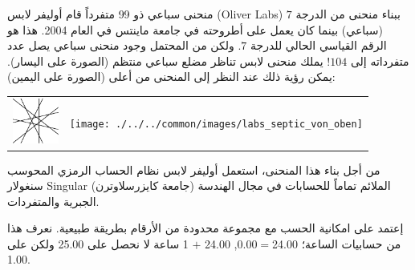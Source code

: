 \begin{surferPage}{منحنى سباعي ذو 99 متفرداً}
      قام أوليفر لابس
      \textenglish{(Oliver Labs)}
       ببناء منحنى من الدرجة $7$ (سباعي) بينما كان يعمل على أطروحته في جامعة ماينتس في العام 2004. هذا هو الرقم القياسي الحالي للدرجة $7$. ولكن من المحتمل وجود منحنى سباعي يصل عدد متفرداته إلى $104$!
    يملك منحنى لابس تناظر مضلع سباعي منتظم (الصورة على اليسار). يمكن رؤية ذلك عند النظر إلى المنحنى من أعلى (الصورة على اليمين):

    \vspace*{-0.3em}
    \begin{center}
      \begin{tabular}{c@{\qquad}c}
        \includegraphics[height=1.5cm]{./../../common/images/labsseptic1.pdf}
        &
        \texttt{[image: ./../../common/images/labs\_septic\_von\_oben]}
      \end{tabular}
    \end{center}
    \vspace*{-0.3em}

    من أجل بناء هذا المنحنى، استعمل أوليفر لابس نظام الحساب الرمزي المحوسب سنغولار \textenglish{\sc Singular} (جامعة كايزرسلاوترن) الملائم تماماً للحسابات في مجال الهندسة الجبرية والمتفردات.

    إعتمد على امكانية الحسب مع مجموعة محدودة من الأرقام بطريقة طبيعية. نعرف هذا من حسابيات الساعة؛ 24.00$=$0.00, 24.00 $+$ 1 ساعة لا نحصل على 25.00 ولكن على 1.00.
\end{surferPage}
